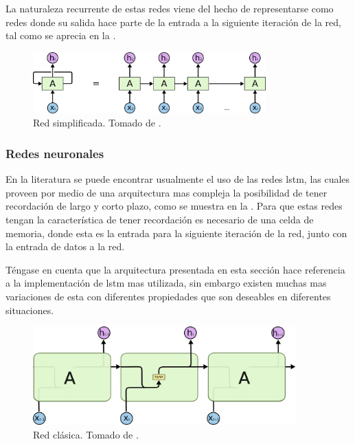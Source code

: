 La naturaleza recurrente de estas redes viene del hecho de representarse como redes donde su salida hace parte de la entrada a la siguiente iteración de la red, tal como se aprecia en la .

\begin{figure}[H]
  \centering
  \includegraphics[width=0.8\textwidth]{Figures/RNN-unrolled.png}
\decoRule
\caption[Red  simplificada]{Red  simplificada. Tomado de \cite{understanding-lstm}.}
\label{fig:rnn-classic-simple}
\end{figure}

\subsubsection{Redes neuronales }
En la literatura se puede encontrar usualmente el uso de las redes \gls{lstm}, las cuales proveen por medio de una arquitectura mas compleja la posibilidad de tener recordación de largo y corto plazo, como se muestra en la . Para que estas redes tengan la característica de tener recordación es necesario de una celda de memoria, donde esta es la entrada para la siguiente iteración de la red, junto con la entrada de datos a la red.

Téngase en cuenta que la arquitectura presentada en esta sección hace referencia a la implementación de \gls{lstm} mas utilizada, sin embargo existen muchas mas variaciones de esta con diferentes propiedades que son deseables en diferentes situaciones.
\begin{figure}[H]
  \centering
  \includegraphics[width=0.9\textwidth]{Figures/LSTM3-SimpleRNN.png}
\decoRule
\caption[Red  clásica]{Red  clásica. Tomado de \cite{understanding-lstm}.}
\label{fig:rnn-classic}
\end{figure}


